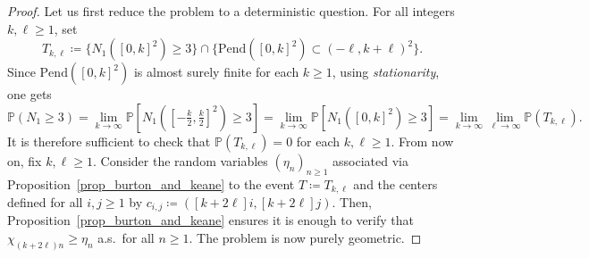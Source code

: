 \documentclass[a4paper, 11pt]{article} %
\theoremstyle{plain}
\newcommand{\backward}{\mathrm{Pend}}
\newcommand{\1}{\mathds 1}
\renewcommand{\P}{\mathbb{P}}
\numberwithin{equation}{section}
\begin{document}
\begin{proof}
    Let us first reduce the problem to a deterministic question. For all integers $k,\ell\geq 1$, set
        \begin{equation}
            \label{eq_trifurcation_2}
            T_{k,\ell}\coloneqq\{N_1([0,k]^2)\geq3\}\cap\{\backward([0,k]^2)\subset(-\ell, k+\ell)^2\}.
        \end{equation}
    Since $\backward([0,k]^2)$ is almost surely finite for each $k\geq1$, using \emph{stationarity}, one gets
        \[\P(N_1\geq3)=\lim_{k\to\infty}\P[N_1([-\tfrac k2,\tfrac k2]^2)\geq 3]=\lim_{k\to\infty}\P[N_1([0,k]^2)\geq3]=\lim_{k\to\infty}\lim_{\ell\to\infty}\P(T_{k,\ell}).\]
    It is therefore sufficient to check that $\P(T_{k,\ell})=0$ for each $k,\ell\geq 1$. From now on, fix $k,\ell\geq 1$. Consider the random variables $(\eta_n)_{n\geq 1}$ associated via Proposition~\ref{prop_burton_and_keane} to the event $T\coloneq T_{k,\ell}$ and the centers defined for all $i, j\geq1$ by $c_{i, j}\coloneq([k+2\ell]i, [k+2\ell]j)$. Then, Proposition~\ref{prop_burton_and_keane} ensures it is enough to verify that $\chi_{(k+2\ell)n}\geq\eta_n$ a.s.\ for all $n\geq 1$. The problem is now purely geometric. 
    

\end{proof}
\end{document}
